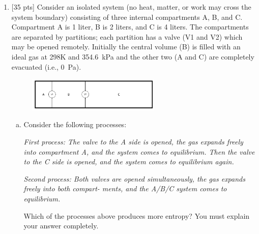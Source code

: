\begin{enumerate}
\begin{enumerate}[(a)]
    \end{enumerate}

    \pagebreak

  \item  {[35 pts]} Consider an isolated system (no heat, matter, or
    work may cross the system boundary)
    consisting of three internal compartments A, B, and C.
    Compartment A is 1 liter, B is 2 liters, and
    C is 4 liters. The compartments are separated by partitions; each
    partition has a valve (V1 and V2)
    which may be opened remotely. Initially the central volume (B) is
    filled with an ideal gas at 298K and
    \SI{354.6}{\kilo\pascal} and the other two (A and C) are
    completely evacuated (i.e., \SI{0}{\pascal}).

    \begin{figure}[ht]
      \centering
      \includegraphics[width=0.6\textwidth]{./assets/q_4_fig.png}
    \end{figure}

    \begin{enumerate}[(a)]
      \item Consider the following processes:

        \textit{First process: The valve to the A side is opened, the gas
          expands freely into compartment A, and
          the system comes to equilibrium. Then the valve to the C side
          is opened, and the system comes
        to equilibrium again.}

        \hspace{0.5 cm}

        \textit{Second process: Both valves are opened simultaneously, the
          gas expands freely into both compart-
        ments, and the A/B/C system comes to equilibrium.}

        \hspace{0.5 cm}

        Which of the processes above produces more entropy? You must
        explain your answer completely.

\end{enumerate}
\end{enumerate}
